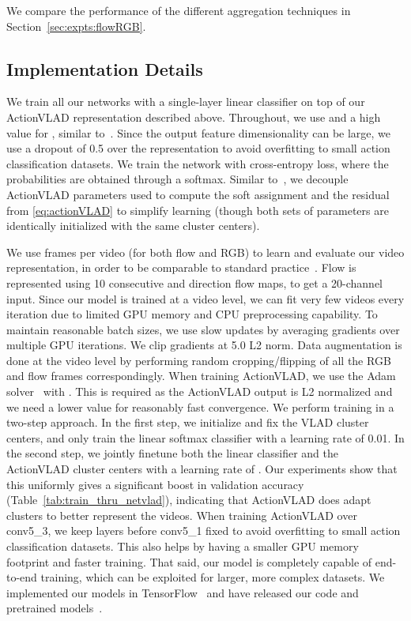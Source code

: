 \documentclass[10pt,twocolumn,letterpaper]{article}
\newcommand{\methodTag}[0]{ActionVLAD}
\begin{document}
We compare the performance of the different aggregation techniques in Section~\ref{sec:expts:flowRGB}.


\subsection{Implementation Details}\label{sec:impl-details}


We train all our networks with a single-layer linear
classifier on top of our \methodTag{} representation
described above. Throughout, we use 
and a high value for , similar to~\cite{Arandjelovic16}.
Since the output feature dimensionality can be
large, we use a dropout of 0.5 over the 
representation to avoid overfitting to small action classification
datasets. We train the network with cross-entropy loss, where 
the probabilities are obtained through a softmax. Similar
to~\cite{Arandjelovic16}, we decouple \methodTag{} parameters  used to compute the soft assignment and the residual from \eqref{eq:actionVLAD} to simplify learning (though both sets of parameters are identically initialized with the same cluster centers).

We use  frames per video (for both flow and RGB) to learn and evaluate our video representation,
in order to be comparable to standard practice~\cite{Simonyan_14b,WangL_16a}.
Flow is represented using 10 consecutive  and  direction flow maps, to get 
a 20-channel input.
Since our model is trained at a video level, we can fit very few videos every iteration
due to limited GPU memory and CPU preprocessing capability. To maintain reasonable batch sizes, we use slow updates by 
averaging gradients over multiple GPU iterations.
We clip gradients at 5.0 L2 norm.
Data augmentation is done at the video level by 
performing random cropping/flipping of all the RGB and flow
frames correspondingly.
When training \methodTag{}, we use the Adam solver~\cite{Kingma14} with
. This is required as the \methodTag{} output is L2 normalized
and we need a lower  value for reasonably fast convergence.
We perform training in a two-step approach. In
the first step, we initialize and fix the VLAD cluster centers,
and only train the linear softmax
classifier with a learning rate of 0.01.
In the second step, we jointly finetune both
the linear classifier and the \methodTag{}
cluster centers with a learning 
rate of .
Our experiments show that this uniformly gives a significant boost in validation accuracy (Table~\ref{tab:train_thru_netvlad}), indicating that \methodTag{} does adapt clusters to better represent the videos.
When training \methodTag{} over conv5\_3,
we keep layers before conv5\_1 fixed
to avoid overfitting to small action classification datasets.
This also helps by having a smaller GPU memory footprint and faster training.
That said, our model is completely capable of end-to-end training,
which can be exploited for larger, more complex datasets.
We implemented our models in TensorFlow~\cite{tensorflow2015-whitepaper} and have released our code and pretrained models~\cite{webpage}.
\end{document}
